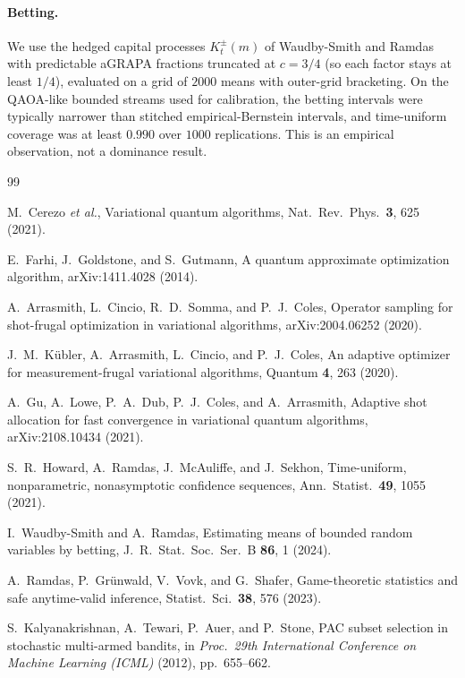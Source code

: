 \documentclass[a4paper,onecolumn,unpublished]{quantumarticle}
\begin{document}
\paragraph*{Betting.}
We use the hedged capital processes $K_t^\pm(m)$ of Waudby-Smith and Ramdas \cite{waudby2024} with predictable aGRAPA fractions truncated at $c = 3/4$ (so each factor stays at least $1/4$), evaluated on a grid of $2000$ means with outer-grid bracketing. On the QAOA-like bounded streams used for calibration, the betting intervals were typically narrower than stitched empirical-Bernstein intervals, and time-uniform coverage was at least $0.990$ over $1000$ replications. This is an empirical observation, not a dominance result.

\begin{thebibliography}{99}
\setlength{\itemsep}{1.5pt}

 M.~Cerezo \emph{et al.}, Variational quantum algorithms, Nat.\ Rev.\ Phys.\ \textbf{3}, 625 (2021).

 E.~Farhi, J.~Goldstone, and S.~Gutmann, A quantum approximate optimization algorithm, arXiv:1411.4028 (2014).

 A.~Arrasmith, L.~Cincio, R.~D.~Somma, and P.~J.~Coles, Operator sampling for shot-frugal optimization in variational algorithms, arXiv:2004.06252 (2020).

 J.~M.~K{\"u}bler, A.~Arrasmith, L.~Cincio, and P.~J.~Coles, An adaptive optimizer for measurement-frugal variational algorithms, Quantum \textbf{4}, 263 (2020).

 A.~Gu, A.~Lowe, P.~A.~Dub, P.~J.~Coles, and A.~Arrasmith, Adaptive shot allocation for fast convergence in variational quantum algorithms, arXiv:2108.10434 (2021).

 S.~R.~Howard, A.~Ramdas, J.~McAuliffe, and J.~Sekhon, Time-uniform, nonparametric, nonasymptotic confidence sequences, Ann.\ Statist.\ \textbf{49}, 1055 (2021).

 I.~Waudby-Smith and A.~Ramdas, Estimating means of bounded random variables by betting, J.\ R.\ Stat.\ Soc.\ Ser.\ B \textbf{86}, 1 (2024).

 A.~Ramdas, P.~Gr{\"u}nwald, V.~Vovk, and G.~Shafer, Game-theoretic statistics and safe anytime-valid inference, Statist.\ Sci.\ \textbf{38}, 576 (2023).

 S.~Kalyanakrishnan, A.~Tewari, P.~Auer, and P.~Stone, PAC subset selection in stochastic multi-armed bandits, in \emph{Proc.\ 29th International Conference on Machine Learning (ICML)} (2012), pp.~655--662.


\end{thebibliography}
\end{document}
